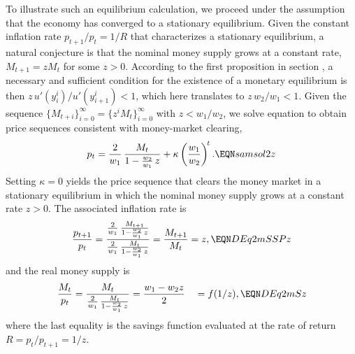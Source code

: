 To illustrate such an equilibrium calculation, we proceed under the
assumption that the economy has converged to a stationary equilibrium.
Given the constant inflation rate $p_{t+1}/p_t = 1/R$ that
characterizes a stationary equilibrium, a natural conjecture is that
the nominal money supply grows at a constant rate,
$M_{t+1} = z M_t$ for some $z > 0$.
According to the first proposition in section ,
a necessary and sufficient condition for the existence of a monetary
equilibrium is then $z\,u'(y^i_i)/u'(y^i_{i+1}) < 1$, which here
translates to $z\,w_2/w_1 < 1$.%
Given the sequence
$\{M_{t+i}\}_{i=0}^{\infty} = \{z^i M_t\}_{i=0}^{\infty}$
with $z < w_1/w_2$, we solve equation  to obtain price
sequences consistent with money-market clearing,
$$
  p_t = {2 \over w_1}\,{M_t \over 1 - {w_2 \over w_1}\,z}
       + \kappa \left({w_1 \over w_2}\right)^{\!t}.
  \EQN samsol2z
$$
Setting $\kappa = 0$ yields the price sequence that clears the money
market in a stationary equilibrium in which the nominal money supply
grows at a constant rate $z > 0$.
The associated inflation rate is
$$
  {p_{t+1} \over p_t}
     = { {2 \over w_1}\,{M_{t+1} \over 1 - {w_2 \over w_1}\,z}
         \over
         {2 \over w_1}\,{M_t    \over 1 - {w_2 \over w_1}\,z} }
     = {M_{t+1} \over M_t} = z,
  \EQN DEq2mSSPz
$$
and the real money supply is
$$
  {M_t \over p_t}
     = {M_t \over {2 \over w_1}\,{M_t \over 1 - {w_2 \over w_1}\,z}}
     = {w_1 - w_2 z \over 2} \quad = f(1/z),
  \EQN DEq2mSz
$$
where the last equality is the savings function evaluated at the rate
of return $R = p_t/p_{t+1} = 1/z$.

